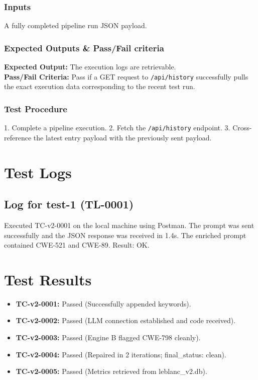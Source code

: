 \documentclass[12pt, a4paper]{article}
\begin{document}
\subsubsection{Inputs}
A fully completed pipeline run JSON payload.
\subsubsection{Expected Outputs \& Pass/Fail criteria}
\textbf{Expected Output:} The execution logs are retrievable. \\
\textbf{Pass/Fail Criteria:} Pass if a GET request to \texttt{/api/history} successfully pulls the exact execution data corresponding to the recent test run.
\subsubsection{Test Procedure}
1. Complete a pipeline execution. 2. Fetch the \texttt{/api/history} endpoint. 3. Cross-reference the latest entry payload with the previously sent payload.

\section{Test Logs}
\subsection{Log for test-1 (TL-0001)}
Executed TC-v2-0001 on the local machine using Postman. The prompt was sent successfully and the JSON response was received in 1.4s. The enriched prompt contained CWE-521 and CWE-89. Result: OK.

\section{Test Results}
\begin{itemize}
    \item \textbf{TC-v2-0001:} Passed (Successfully appended keywords).
    \item \textbf{TC-v2-0002:} Passed (LLM connection established and code received).
    \item \textbf{TC-v2-0003:} Passed (Engine B flagged CWE-798 cleanly).
    \item \textbf{TC-v2-0004:} Passed (Repaired in 2 iterations; final\_status: clean).
    \item \textbf{TC-v2-0005:} Passed (Metrics retrieved from leblanc\_v2.db).
\end{itemize}
\end{document}
